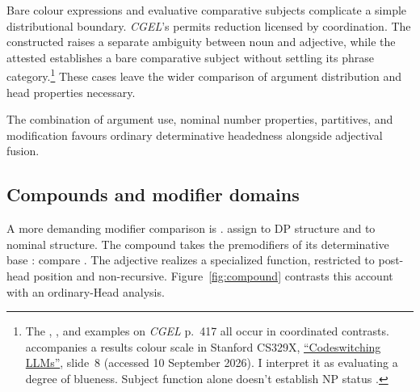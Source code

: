 \documentclass[12pt]{article}
\begin{document}
Bare colour expressions and evaluative comparative subjects complicate a simple distributional boundary. \textit{CGEL}'s  permits reduction licensed by coordination. The constructed  raises a separate ambiguity between noun and adjective, while the attested  establishes a bare comparative subject without settling its phrase category.\footnote{The , , and  examples on \textit{CGEL} p.~417 all occur in coordinated contrasts.  accompanies a results colour scale in Stanford CS329X, \href{https://web.stanford.edu/class/cs329x/slides/Lecture12_B_Codeswitching\%20LLMs.pdf}{\enquote{Codeswitching LLMs}}, slide~8 (accessed 10 September 2026). I interpret it as evaluating a degree of blueness. Subject function alone doesn't establish NP status \citep[236]{huddleston2002}.} These cases leave the wider comparison of argument distribution and head properties necessary.

The combination of argument use, nominal number properties, partitives, and modification favours ordinary determinative headedness alongside adjectival fusion.

\subsection{Compounds and modifier domains}\label{sec:compounds}

A more demanding modifier comparison is . \textcite[581--583]{Payne2007} assign  to DP structure and  to nominal structure. The compound  takes the premodifiers of its determinative base : compare . The adjective realizes a specialized  function, restricted to post-head position and non-recursive. Figure~\ref{fig:compound} contrasts this account with an ordinary-Head analysis.
\end{document}
